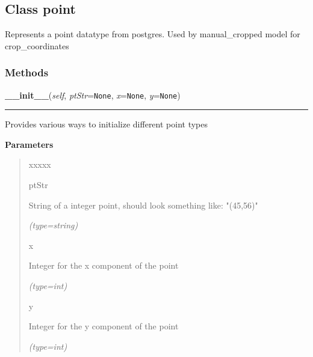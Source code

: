 \subsection{Class point}

    \label{src:dao:model:point:point}
Represents a point datatype from postgres. Used by manual\_cropped model 
for crop\_coordinates



  \subsubsection{Methods}

    \label{src:dao:model:point:point:__init__}

    \vspace{0.5ex}

\hspace{.8\funcindent}\begin{boxedminipage}{\funcwidth}

    \raggedright \textbf{\_\_init\_\_}(\textit{self}, \textit{ptStr}={\tt None}, \textit{x}={\tt None}, \textit{y}={\tt None})

    \vspace{-1.5ex}

    \rule{\textwidth}{0.5\fboxrule}
\setlength{\parskip}{2ex}
    Provides various ways to initialize different point types

\setlength{\parskip}{1ex}
      \textbf{Parameters}
      \vspace{-1ex}

      \begin{quote}
        \begin{Ventry}{xxxxx}

          \item[ptStr]

          String of a integer point, should look something like: "(45,56)"

            {\it (type=string)}

          \item[x]

          Integer for the x component of the point

            {\it (type=int)}

          \item[y]

          Integer for the y component of the point

            {\it (type=int)}

        \end{Ventry}

      \end{quote}

    \end{boxedminipage}

